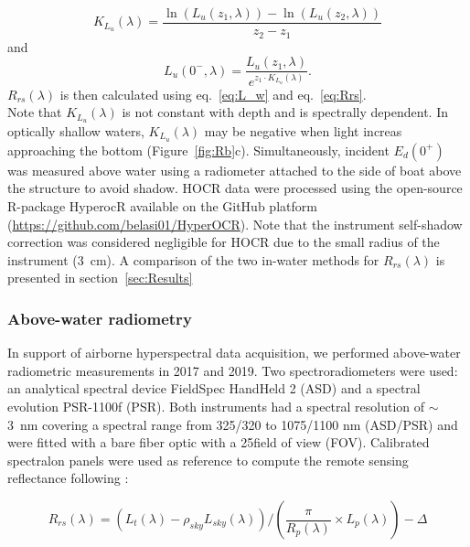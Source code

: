 \documentclass[essd, manuscript]{copernicus}
\begin{document}
\begin{equation}
    K_{L_u}(\lambda) = \frac{\ln(L_u(z_1,\lambda)) - \ln ( L_u(z_2,\lambda))}{z_2-z_1}
\end{equation}
and
\begin{equation}
    L_u(0^-,\lambda) = \frac{L_u(z_1,\lambda)}{e^{z_1 \cdot K_{L_u}(\lambda)}}.
\end{equation}
$R_{rs}(\lambda)$ is then calculated using eq.~\ref{eq:L_w} and eq.~\ref{eq:Rrs}. \\

Note that $K_{L_u}(\lambda)$ is not constant with depth and is spectrally dependent. In optically shallow waters, $K_{L_u}(\lambda)$ may be negative when light increas approaching the bottom (Figure~\ref{fig:Rb}c). Simultaneously, incident $E_d(0^+)$ was measured above water using a radiometer attached to the side of boat above the structure to avoid shadow. HOCR data were processed using the open-source R-package HyperocR available on the GitHub platform (\url{https://github.com/belasi01/HyperOCR}). Note that the instrument self-shadow correction was considered negligible for HOCR due to the small radius of the instrument (3~cm). A comparison of the two in-water methods for $R_{rs}(\lambda)$ is presented in section~\ref{sec:Results}\\  





\subsubsection{Above-water radiometry}
In support of airborne hyperspectral data acquisition, we performed above-water radiometric measurements in 2017 and 2019. Two spectroradiometers were used: an analytical spectral device FieldSpec HandHeld 2 (ASD) and a spectral evolution PSR-1100f (PSR). Both instruments had a spectral resolution of $\sim$3~nm covering a spectral range from 325/320 to 1075/1100 nm (ASD/PSR) and were fitted with a bare fiber optic with a 25\degree field of view (FOV). Calibrated spectralon panels were used as reference to compute the remote sensing reflectance following \citet{Mobley1999}: 

\begin{equation}
    \label{eq:Rrs_above}
    R_{rs}(\lambda) = (L_t(\lambda) - \rho_{sky}L_{sky}(\lambda)) / \left( \frac{\pi}{R_p(\lambda)}\times L_p(\lambda) \right) - \Delta
\end{equation}
\end{document}
